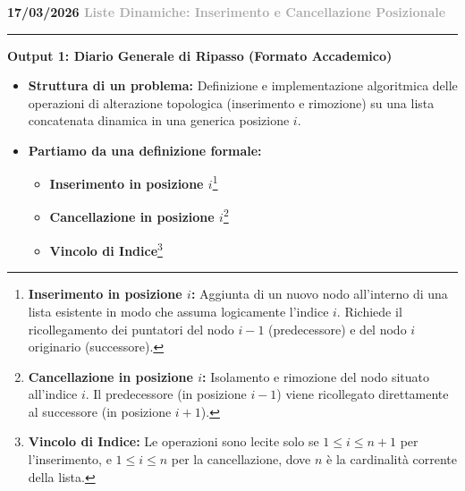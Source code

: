 \documentclass[a4paper, 11pt]{report}
\newcommand{\lezione}[2]{
\vspace{2em}
\noindent\textbf{\Large #1 \hfill \textcolor{darkgray}{#2}}
\vspace{0.5em}
\hrule
\vspace{1.5em}
}
\newcommand{\definizione}[2]{%
\textbf{#1}\footnote{\textbf{#1:} #2}%
}
\begin{document}
\lezione{17/03/2026}{Liste Dinamiche: Inserimento e Cancellazione Posizionale}

\vspace{0.5cm}
\textbf{Output 1: Diario Generale di Ripasso (Formato Accademico)}

\begin{itemize}
    \item \textbf{Struttura di un problema:}
    Definizione e implementazione algoritmica delle operazioni di alterazione topologica (inserimento e rimozione) su una lista concatenata dinamica in una generica posizione $i$.

    \item \textbf{Partiamo da una definizione formale:}
    \begin{itemize}
        \item \definizione{Inserimento in posizione $i$}{Aggiunta di un nuovo nodo all'interno di una lista esistente in modo che assuma logicamente l'indice $i$. Richiede il ricollegamento dei puntatori del nodo $i-1$ (predecessore) e del nodo $i$ originario (successore).}
        \item \definizione{Cancellazione in posizione $i$}{Isolamento e rimozione del nodo situato all'indice $i$. Il predecessore (in posizione $i-1$) viene ricollegato direttamente al successore (in posizione $i+1$).}
        \item \definizione{Vincolo di Indice}{Le operazioni sono lecite solo se $1 \le i \le n+1$ per l'inserimento, e $1 \le i \le n$ per la cancellazione, dove $n$ è la cardinalità corrente della lista.}
    \end{itemize}


\end{itemize}
\end{document}
